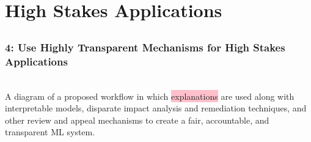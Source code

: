 \documentclass[11pt,aspectratio=169,hyperref={colorlinks}]{beamer}
\begin{document}
	\section{High Stakes Applications}

	\subsection*{} %

	\begin{frame}
	
		\frametitle{4: Use Highly Transparent Mechanisms for \textbf{High Stakes Applications}}
		\vspace{2pt}
		\\
		\vspace{5pt}
		\scriptsize{A diagram of a proposed workflow in which \colorbox{pink}{explanations} are used along with interpretable models, disparate impact analysis and remediation techniques, and other review and appeal mechanisms to create a fair, accountable, and transparent ML system.}
	
	\end{frame}
\end{document}
